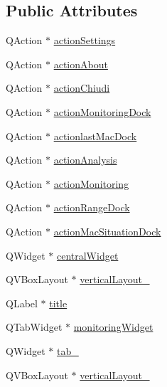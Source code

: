 \subsection*{Public Attributes}
\begin{DoxyCompactItemize}
\item 
Q\+Action $\ast$ \hyperlink{class_ui___main_window_a5b65436e6cc259d5586eb6e309b612e4}{action\+Settings}
\item 
Q\+Action $\ast$ \hyperlink{class_ui___main_window_abdf2b43167c2cd0d3405f90b8c30e934}{action\+About}
\item 
Q\+Action $\ast$ \hyperlink{class_ui___main_window_a14709ab6646807eb0432b323cb2eab49}{action\+Chiudi}
\item 
Q\+Action $\ast$ \hyperlink{class_ui___main_window_a2f015f144c5a30b268bf794624af029d}{action\+Monitoring\+Dock}
\item 
Q\+Action $\ast$ \hyperlink{class_ui___main_window_af3f942760ccfa6c8094a44986ba0b3c3}{actionlast\+Mac\+Dock}
\item 
Q\+Action $\ast$ \hyperlink{class_ui___main_window_a6d986bfde28c6deee2643e34424118d2}{action\+Analysis}
\item 
Q\+Action $\ast$ \hyperlink{class_ui___main_window_a892b714360feffc3779aaf4f1f385299}{action\+Monitoring}
\item 
Q\+Action $\ast$ \hyperlink{class_ui___main_window_a1a7793916672ff4cadb3dde3f75a6138}{action\+Range\+Dock}
\item 
Q\+Action $\ast$ \hyperlink{class_ui___main_window_a9f53a93522f164284ef4637fa56339ea}{action\+Mac\+Situation\+Dock}
\item 
Q\+Widget $\ast$ \hyperlink{class_ui___main_window_a30075506c2116c3ed4ff25e07ae75f81}{central\+Widget}
\item 
Q\+V\+Box\+Layout $\ast$ \hyperlink{class_ui___main_window_afcc20a3d5058037a00cdc6122f231848}{vertical\+Layout\+\_}
\item 
Q\+Label $\ast$ \hyperlink{class_ui___main_window_a330a07aad35056d3f75fb65ca7d96270}{title}
\item 
Q\+Tab\+Widget $\ast$ \hyperlink{class_ui___main_window_af52a2c82dcdf9f0aa4c962ec0a51b422}{monitoring\+Widget}
\item 
Q\+Widget $\ast$ \hyperlink{class_ui___main_window_a41c7e77dd12b9445e13dbe8fb5ae1488}{tab\+\_}
\item 
Q\+V\+Box\+Layout $\ast$ \hyperlink{class_ui___main_window_a93c190b085c63a667c535ba0bbcfec7c}{vertical\+Layout\+\_}
\item 

\end{DoxyCompactItemize}
